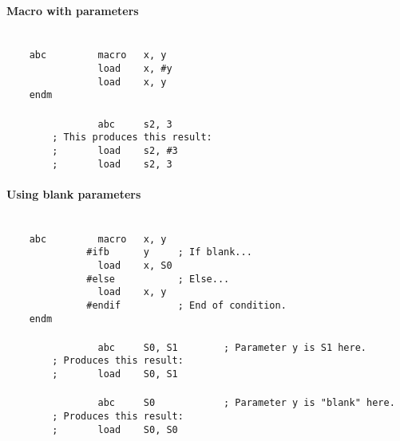         \paragraph{Macro with parameters}
            ~\\
            \verb'    abc         macro   x, y'\\
            \verb'                load    x, #y'\\
            \verb'                load    x, y'\\
            \verb'    endm'\\
            \verb''\\
            \verb'                abc     s2, 3'\\
            \verb'        ; This produces this result:'\\
            \verb'        ;       load    s2, #3'\\
            \verb'        ;       load    s2, 3'

        \enlargethispage{5\baselineskip}
        \paragraph{Using blank parameters}
            ~\\
            \verb'    abc         macro   x, y'\\
            \verb'              #ifb      y     ; If blank...'\\
            \verb'                load    x, S0'\\
            \verb'              #else           ; Else...'\\
            \verb'                load    x, y'\\
            \verb'              #endif          ; End of condition.'\\
            \verb'    endm'\\
            \verb''\\
            \verb'                abc     S0, S1        ; Parameter y is S1 here.'\\
            \verb'        ; Produces this result:'\\
            \verb'        ;       load    S0, S1'\\
            \verb''\\
            \verb'                abc     S0            ; Parameter y is "blank" here.'\\
            \verb'        ; Produces this result:'\\
            \verb'        ;       load    S0, S0'\\

